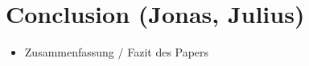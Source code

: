 \section{Conclusion (Jonas, Julius)}

\begin{itemize}
    \item Zusammenfassung / Fazit des Papers
\end{itemize}

